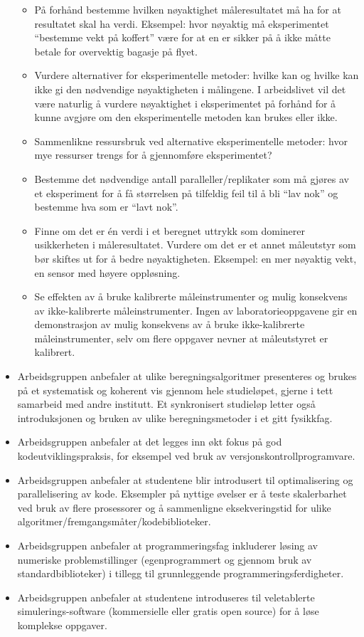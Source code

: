 \documentclass{article}
\begin{document}
\begin{itemize}
    \begin{itemize}
      \item På forhånd bestemme hvilken nøyaktighet måleresultatet må ha for at resultatet skal ha verdi. Eksempel: hvor nøyaktig må eksperimentet ``bestemme vekt på koffert'' være for at en er sikker på å ikke måtte betale for overvektig bagasje på flyet.
      \item Vurdere alternativer for eksperimentelle metoder: hvilke kan og hvilke kan ikke gi den nødvendige nøyaktigheten i målingene. I arbeidslivet vil det være naturlig å vurdere nøyaktighet i eksperimentet på forhånd for å kunne avgjøre om den eksperimentelle metoden kan brukes eller ikke. 
      \item Sammenlikne ressursbruk ved alternative eksperimentelle metoder: hvor mye ressurser trengs for å gjennomføre eksperimentet?
      \item Bestemme det nødvendige antall paralleller/replikater som må gjøres av et eksperiment for å få størrelsen på tilfeldig feil til å bli ``lav nok'' og bestemme hva som er ``lavt nok''.
      \item Finne om det er én verdi i et beregnet uttrykk som dominerer usikkerheten i måleresultatet. Vurdere om det er et annet måleutstyr som bør skiftes ut for å bedre nøyaktigheten. Eksempel: en mer nøyaktig vekt, en sensor med høyere oppløsning.
      \item Se effekten av å bruke kalibrerte måleinstrumenter og mulig konsekvens av ikke-kalibrerte måleinstrumenter. Ingen av laboratorieoppgavene gir en demonstrasjon av mulig konsekvens av å bruke ikke-kalibrerte måleinstrumenter, selv om flere oppgaver nevner at måleutstyret er kalibrert. 
    \end{itemize}
  \item Arbeidsgruppen anbefaler at ulike beregningsalgoritmer presenteres og brukes på et systematisk og koherent vis gjennom hele studieløpet, gjerne i tett samarbeid med andre institutt. Et synkronisert studieløp letter også introduksjonen og bruken av ulike beregningsmetoder i et gitt fysikkfag.
  \item Arbeidsgruppen anbefaler at det legges inn økt fokus på god kodeutviklingspraksis, for eksempel ved bruk av versjonskontrollprogramvare.
  \item Arbeidsgruppen anbefaler at studentene blir introdusert til optimalisering og parallelisering av kode. Eksempler på nyttige øvelser er å teste skalerbarhet ved bruk av flere prosessorer og å sammenligne eksekveringstid for ulike algoritmer/fremgangsmåter/kodebiblioteker.
  \item Arbeidsgruppen anbefaler at programmeringsfag inkluderer løsing av numeriske problemstillinger (egenprogrammert og gjennom bruk av standardbiblioteker) i tillegg til grunnleggende programmeringsferdigheter.
  \item Arbeidsgruppen anbefaler at studentene introduseres til veletablerte simulerings-software (kommersielle eller gratis open source) for å løse komplekse oppgaver.

   
\end{itemize}
\end{document}
